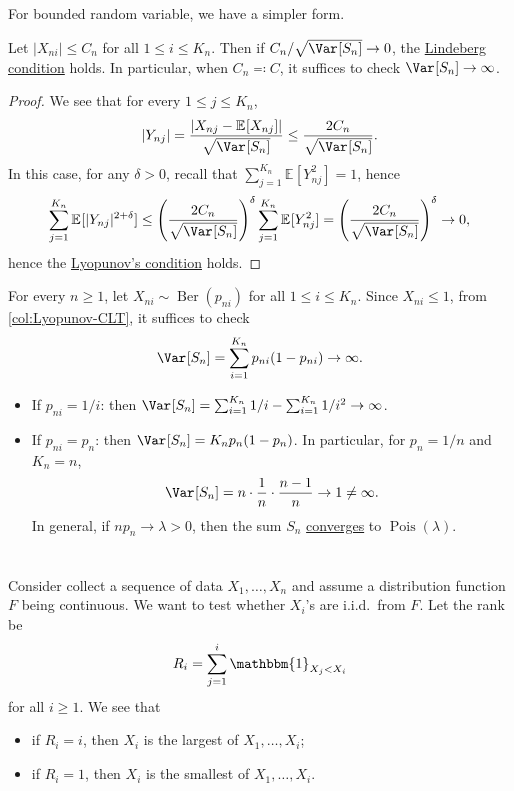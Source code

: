 For bounded random variable, we have a simpler form.

\begin{corollary}\label{col:Lyopunov-CLT}
	Let \(\vert X_{ni} \vert \leq C_n\) for all \(1 \leq i \leq K_n\). Then if \(C_n / \sqrt{\Var_{}[S_n] } \to 0\), the \hyperref[def:Lindeberg-condition]{Lindeberg condition} holds. In particular, when \(C_n \eqqcolon C\), it suffices to check \(\Var_{}[S_n] \to \infty \).
\end{corollary}
\begin{proof}
	We see that for every \(1 \leq j \leq K_n\),
	\[
		\vert Y_{nj} \vert
		= \frac{\vert X_{nj} - \mathbb{E}_{}[X_{nj}] \vert }{\sqrt{\Var_{}[S_n] } }
		\leq \frac{2 C_n}{\sqrt{\Var_{}[S_n] } }.
	\]
	In this case, for any \(\delta > 0\), recall that \(\sum_{j=1}^{K_n} \mathbb{E}_{}[Y_{nj}^2] = 1\), hence
	\[
		\sum_{j=1}^{K_n} \mathbb{E}_{}[\vert Y_{nj} \vert ^{2 + \delta }]
		\leq \left( \frac{2C_n}{\sqrt{\Var_{}[S_n] } } \right) ^\delta \sum_{j=1}^{K_n} \mathbb{E}_{}[Y_{nj}^2]
		= \left( \frac{2C_n}{\sqrt{\Var_{}[S_n] } } \right) ^\delta
		\to 0,
	\]
	hence the \hyperref[thm:Lyopunov-CLT]{Lyopunov's condition} holds.
\end{proof}

\begin{eg}\label{eg:Lyopunov-CLT}
	For every \(n \geq 1\), let \(X_{ni} \sim \operatorname{Ber}(p_{ni}) \) for all \(1 \leq i \leq K_n\). Since \(X_{ni} \leq 1\), from \autoref{col:Lyopunov-CLT}, it suffices to check
	\[
		\Var_{}[S_n]
		= \sum_{i=1}^{K_n} p_{ni} (1 - p_{ni}) \to \infty .
	\]
	\begin{itemize}
		\item If \(p_{ni} = 1 / i\): then \(\Var_{}[S_n] = \sum_{i=1}^{K_n} 1 / i - \sum_{i=1}^{K_n} 1 / i^2 \to \infty \).
		\item If \(p_{ni} = p_n\): then \(\Var_{}[S_n] = K_n p_n (1 - p_n)\). In particular, for \(p_n = 1 / n\) and \(K_n = n\),
		      \[
			      \Var_{}[S_n]
			      = n \cdot \frac{1}{n} \cdot \frac{n-1}{n}
			      \to 1
			      \neq \infty .
		      \]
		      In general, if \(n p_n \to \lambda > 0\), then the sum \(S_n\) \hyperref[def:converge-in-distribution]{converges} to \(\operatorname{Pois}(\lambda ) \).
	\end{itemize}
\end{eg}

\section{}
Consider collect a sequence of data \(X_1, \dots , X_n\) and assume a distribution function \(F\) being continuous. We want to test whether \(X_i\)'s are i.i.d.\ from \(F\). Let the rank be
\[
	R_i = \sum_{j=1}^{i} \mathbbm{1}_{X_j < X_i}
\]
for all \(i \geq 1\). We see that
\begin{itemize}
	\item if \(R_i = i\), then \(X_i\) is the largest of \(X_1, \dots , X_i\);
	\item if \(R_i = 1\), then \(X_i\) is the smallest of \(X_1, \dots , X_i\).
\end{itemize}


